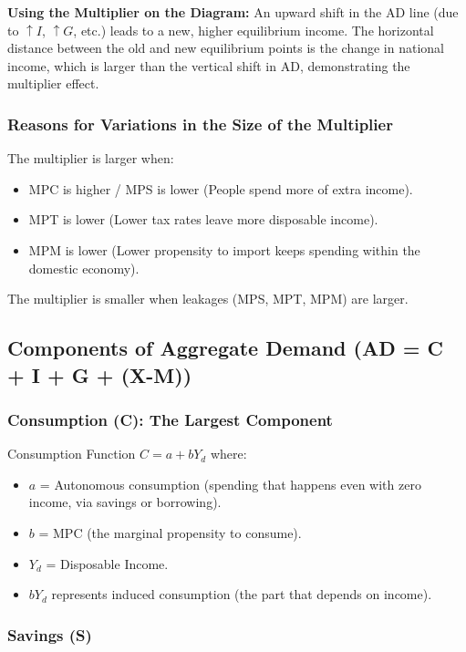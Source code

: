 \documentclass[11pt, a4paper, twoside]{book}
\begin{document}
\textbf{Using the Multiplier on the Diagram:} An upward shift in the AD line (due to $\uparrow I$, $\uparrow G$, etc.) leads to a new, higher equilibrium income. The horizontal distance between the old and new equilibrium points is the change in national income, which is larger than the vertical shift in AD, demonstrating the multiplier effect.

\subsubsection{Reasons for Variations in the Size of the Multiplier}

The multiplier is larger when:
\begin{itemize}
  \item MPC is higher / MPS is lower (People spend more of extra income).
  \item MPT is lower (Lower tax rates leave more disposable income).
  \item MPM is lower (Lower propensity to import keeps spending within the domestic economy).
\end{itemize}
The multiplier is smaller when leakages (MPS, MPT, MPM) are larger.

\subsection{Components of Aggregate Demand (AD = C + I + G + (X-M))}

\subsubsection{Consumption (C): The Largest Component}

\begin{keyterm}{Consumption Function}
$C = a + bY_d$ where:
\begin{itemize}
  \item $a$ = Autonomous consumption (spending that happens even with zero income, via savings or borrowing).
  \item $b$ = MPC (the marginal propensity to consume).
  \item $Y_d$ = Disposable Income.
  \item $bY_d$ represents induced consumption (the part that depends on income).
\end{itemize}
\end{keyterm}

\subsubsection{Savings (S)}
\end{document}
